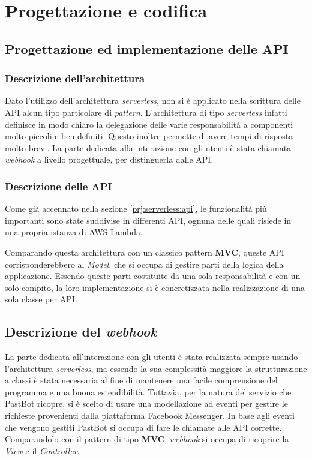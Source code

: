 
\chapter{Progettazione e codifica}

\section{Progettazione ed implementazione delle API}

\subsection{Descrizione dell'architettura}

Dato l'utilizzo dell'architettura \textit{serverless}, non si è applicato nella
scrittura delle API alcun tipo particolare di \textit{pattern}. L'architettura
di tipo \textit{serverless} infatti definisce in modo chiaro la delegazione
delle varie responsabilità a componenti molto piccoli e ben definiti. Questo
inoltre permette di avere tempi di risposta molto brevi.
La parte dedicata alla interazione con gli utenti è stata chiamata
\textit{webhook} a livello progettuale, per distinguerla dalle API.

\subsection{Descrizione delle API}
Come già accennato nella sezione \ref{prj:serverless:api}, le funzionalità più
importanti sono state suddivise in differenti API, ognuna delle quali risiede
in una propria istanza di AWS Lambda.

Comparando questa architettura con un classico pattern \textbf{MVC}, queste API
corrisponderebbero al \textit{Model}, che si occupa di gestire parti della
logica della applicazione. Essendo queste parti costituite da una sola
responsabilità e con un solo compito, la loro implementazione si è
concretizzata nella realizzazione di una sola classe per API.

\section{Descrizione del \textit{webhook}}
La parte dedicata all'interazione con gli utenti è stata realizzata sempre
usando l'architettura \textit{serverless}, ma essendo la sua complessità
maggiore la strutturazione a classi è stata necessaria al fine di mantenere una
facile comprensione del programma e una buona estendibilità. Tuttavia, per la
natura del servizio che PastBot ricopre, si è scelto di usare una modellazione
ad eventi per gestire le richieste provenienti dalla piattaforma Facebook
Messenger. In base agli eventi che vengono gestiti PastBot si occupa di fare le
chiamate alle API corrette. Comparandolo con il pattern di tipo \textbf{MVC},
\textit{webhook} si occupa di ricoprire la \textit{View} e il
\textit{Controller}.

